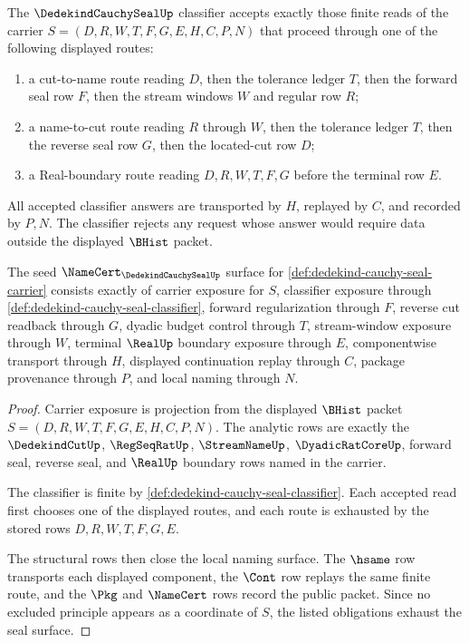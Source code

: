\begin{definition}
\label{def:dedekind-cauchy-seal-classifier}
The $\DedekindCauchySealUp$ classifier accepts exactly those finite reads of the carrier $S=(D,R,W,T,F,G,E,H,C,P,N)$ that proceed through one of the following displayed routes:
\begin{enumerate}
\item a cut-to-name route reading $D$, then the tolerance ledger $T$, then the forward seal row $F$, then the stream windows $W$ and regular row $R$;
\item a name-to-cut route reading $R$ through $W$, then the tolerance ledger $T$, then the reverse seal row $G$, then the located-cut row $D$;
\item a Real-boundary route reading $D,R,W,T,F,G$ before the terminal row $E$.
\end{enumerate}
All accepted classifier answers are transported by $H$, replayed by $C$, and recorded by $P,N$. The classifier rejects any request whose answer would require data outside the displayed $\BHist$ packet.
\end{definition}

\begin{theorem}
\label{thm:dedekind-cauchy-seal-namecert-obligations}
The seed $\NameCert_{\DedekindCauchySealUp}$ surface for \autoref{def:dedekind-cauchy-seal-carrier} consists exactly of carrier exposure for $S$, classifier exposure through \autoref{def:dedekind-cauchy-seal-classifier}, forward regularization through $F$, reverse cut readback through $G$, dyadic budget control through $T$, stream-window exposure through $W$, terminal $\RealUp$ boundary exposure through $E$, componentwise transport through $H$, displayed continuation replay through $C$, package provenance through $P$, and local naming through $N$.
\end{theorem}
\begin{proof}
Carrier exposure is projection from the displayed $\BHist$ packet $S=(D,R,W,T,F,G,E,H,C,P,N)$. The analytic rows are exactly the $\DedekindCutUp$, $\RegSeqRatUp$, $\StreamNameUp$, $\DyadicRatCoreUp$, forward seal, reverse seal, and $\RealUp$ boundary rows named in the carrier.

The classifier is finite by \autoref{def:dedekind-cauchy-seal-classifier}. Each accepted read first chooses one of the displayed routes, and each route is exhausted by the stored rows $D,R,W,T,F,G,E$.

The structural rows then close the local naming surface. The $\hsame$ row transports each displayed component, the $\Cont$ row replays the same finite route, and the $\Pkg$ and $\NameCert$ rows record the public packet. Since no excluded principle appears as a coordinate of $S$, the listed obligations exhaust the seal surface.
\end{proof}

